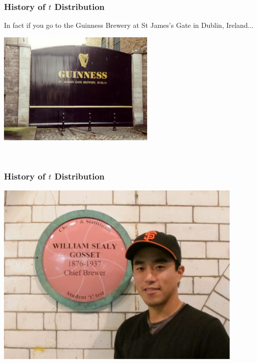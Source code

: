 \documentclass[slides]{beamer}
\begin{document}
\begin{frame}
\frametitle{History of $t$ Distribution}
In fact if you go to the Guinness Brewery at St James's Gate in Dublin, Ireland...
\begin{center}
\includegraphics[width=3in]{brewery.jpg}
\end{center}
\
\end{frame}


\begin{frame}
\frametitle{History of $t$ Distribution}
\begin{center}
\includegraphics[width=0.9\textwidth]{guinness.jpg}
\end{center}
\end{frame}

%
%
%
%
\end{document}
